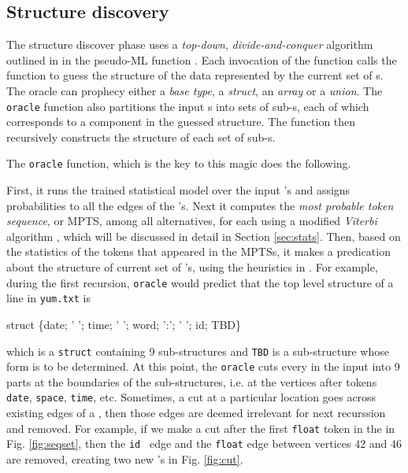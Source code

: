 \subsection{Structure discovery}
The structure discover phase uses a {\em top-down}, {\em
divide-and-conquer} algorithm outlined in 
 in the pseudo-ML function
.  Each invocation of the  function
calls the  function to guess the structure of the data represented
by the current set of \seqset{}s.  The oracle can prophecy
either a {\em base type}, a {\em struct}, an {\em array} or a {\em union}.
The {\tt oracle} function also partitions the input \seqset{}s into
sets of sub-\seqset{}s, each of which corresponds to a component in
the guessed structure.  The  function then recursively 
constructs the structure of each set of sub-\seqset{}s.

The {\tt oracle} function, which is the key to this magic does the
following. 

First, it runs the trained statistical model over the 
input \seqset's and assigns probabilities to all the edges of the \seqset's.
Next it computes the {\em most probable token sequence}, or MPTS, among all alternatives,
for each \seqset{} using a modified {\em Viterbi} algorithm \cite{rabiner89:hmm},
which will be discussed in detail in Section \ref{sec:stats}.
Then, based on the statistics of the tokens that appeared in the MPTSs,
it makes a predication about the structure of current set of
\seqset's, using the heuristics in \cite{fisher+:dirttoshovels}.
For example, during the first recursion, 
{\tt oracle} would predict that the top level structure of
a line in {\tt yum.txt} is 

\begin{centercode}
struct \{date;  ' '; time; ' '; word; ':'; ' '; id; TBD\}
\end{centercode}
which is a {\tt struct} containing 9 sub-structures and {\tt TBD} is a sub-structure
whose form is to be determined. At this point, the {\tt oracle} cuts
every \seqset{} in the input into 9 parts at the boundaries of the sub-structures,
i.e. at the vertices after tokens {\tt date}, {\tt space}, {\tt time}, etc. 
Sometimes, a cut at a particular location goes across existing edges of a
\seqset, then those edges are deemed irrelevant for next recurssion and removed.
For example, if we make a cut after the first {\tt float} token in the \seqset{}
in Fig. \ref{fig:seqset}, then the {\tt id}~ edge and the {\tt float} edge between
vertices 42 and 46 are removed, creating two new \seqset's in Fig. \ref{fig:cut}.


